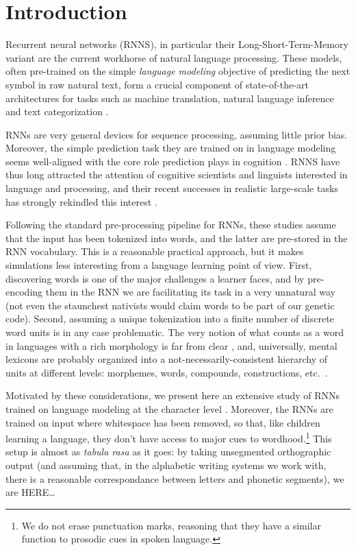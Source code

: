 \section{Introduction}
\label{sec:introduction}

Recurrent neural networks (RNNS), in particular their Long-Short-Term-Memory
variant \cite[LSTMs,][]{Hochreiter:Schmidhuber:1997} are the current workhorse
of natural language processing. These models, often pre-trained on the
simple \emph{language modeling} objective of predicting the next
symbol in raw natural text, form a crucial component of
state-of-the-art architectures for tasks such as machine translation,
natural language inference and text categorization
\cite{Goldberg:2017}.

RNNs are very general devices for sequence processing, assuming little
prior bias. Moreover, the simple prediction task they are trained on
in language modeling seems well-aligned with the core role prediction
plays in cognition \cite[e.g.,][]{Bar:2007,Clark:2016}. RNNS have thus
long attracted the attention of cognitive scientists and linguists
interested in language and processing, and their recent successes in
realistic large-scale tasks has strongly rekindled this interest
\cite[see, e.g.,][and references there]{Frank:etal:2013,Lau:etal:2017,Kirov:Cotterell:2018,McCoy:etal:2018,Pater:2018}.

Following the standard pre-processing pipeline for RNNs, these studies
assume that the input has been tokenized into words, and the latter
are pre-stored in the RNN vocabulary. This is a reasonable practical
approach, but it makes simulations less interesting from a language
learning point of view. First, discovering words is one of the major
challenges a learner faces, and by pre-encoding them in the RNN we are
facilitating its task in a very unnatural way (not even the staunchest
nativists would claim words to be part of our genetic code). Second,
assuming a unique tokenization into a finite number of discrete word
units is in any case problematic. The very notion of what counts as a
word in languages with a rich morphology is far from clear
\cite[e.g.,][]{Bickel:Zuniga:2017}, and, universally, mental lexicons
are probably organized into a not-necessarily-consistent hierarchy of
units at different levels: morphemes, words, compounds, constructions,
etc.~\cite[e.g.,][]{Goldberg:2005}.

Motivated by these considerations, we present here an extensive study
of RNNs trained on language modeling at the character level
\cite{Mikolov:etal:2011,Sutskever:etal:2011,Graves:2014}. Moreover,
the RNNs are trained on input where whitespace has been removed, so
that, like children learning a language, they don't have access to
major cues to wordhood.\footnote{We do not erase punctuation marks,
  reasoning that they have a similar function to prosodic cues in
  spoken language.} This setup is almost as \emph{tabula rasa} as it
goes: by taking unsegmented orthographic output (and assuming that, in
the alphabetic writing systems we work with, there is a reasonable
correspondance between letters and phonetic segments), we are HERE\ldots


